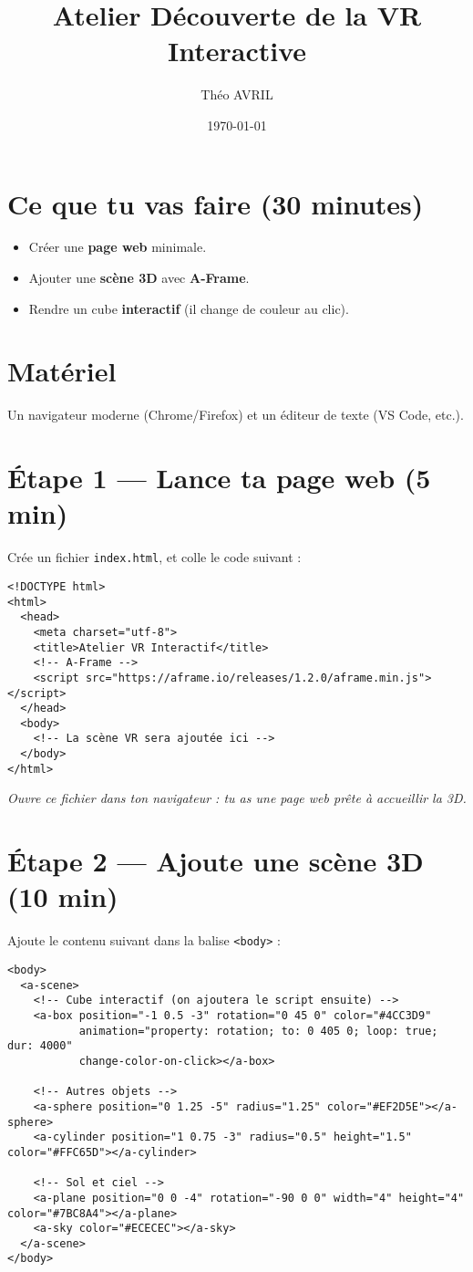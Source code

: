 \documentclass[12pt]{article}
\title{Atelier Découverte de la VR Interactive}
\author{Théo AVRIL}
\date{\today}
\begin{document}
\maketitle

\section*{Ce que tu vas faire (30 minutes)}
\begin{itemize}
  \item Créer une \textbf{page web} minimale.
  \item Ajouter une \textbf{scène 3D} avec \textbf{A-Frame}.
  \item Rendre un cube \textbf{interactif} (il change de couleur au clic).
\end{itemize}

\section*{Matériel}
Un navigateur moderne (Chrome/Firefox) et un éditeur de texte (VS Code, etc.).

\section{Étape 1 — Lance ta page web (5 min)}
Crée un fichier \texttt{index.html}, et colle le code suivant :

\begin{verbatim}
<!DOCTYPE html>
<html>
  <head>
    <meta charset="utf-8">
    <title>Atelier VR Interactif</title>
    <!-- A-Frame -->
    <script src="https://aframe.io/releases/1.2.0/aframe.min.js"></script>
  </head>
  <body>
    <!-- La scène VR sera ajoutée ici -->
  </body>
</html>
\end{verbatim}

\textit{Ouvre ce fichier dans ton navigateur : tu as une page web prête à accueillir la 3D.}

\section{Étape 2 — Ajoute une scène 3D (10 min)}
Ajoute le contenu suivant dans la balise \texttt{<body>} :

\begin{verbatim}
<body>
  <a-scene>
    <!-- Cube interactif (on ajoutera le script ensuite) -->
    <a-box position="-1 0.5 -3" rotation="0 45 0" color="#4CC3D9"
           animation="property: rotation; to: 0 405 0; loop: true; dur: 4000"
           change-color-on-click></a-box>

    <!-- Autres objets -->
    <a-sphere position="0 1.25 -5" radius="1.25" color="#EF2D5E"></a-sphere>
    <a-cylinder position="1 0.75 -3" radius="0.5" height="1.5" color="#FFC65D"></a-cylinder>

    <!-- Sol et ciel -->
    <a-plane position="0 0 -4" rotation="-90 0 0" width="4" height="4" color="#7BC8A4"></a-plane>
    <a-sky color="#ECECEC"></a-sky>
  </a-scene>
</body>
\end{verbatim}
\end{document}
